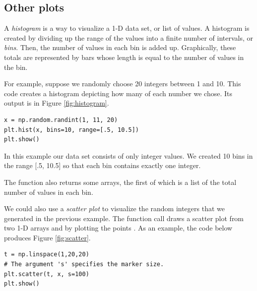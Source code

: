 \subsection*{Other plots}
A \emph{histogram} is a way to visualize a 1-D data set, or list of values.
A histogram is created by dividing up the range of the values into a finite number of intervals, or \emph{bins}.
Then, the number of values in each bin is added up.
Graphically, these totals are represented by bars whose length is equal to the number of values in the bin.

For example, suppose we randomly choose 20 integers between 1 and 10.
This code creates a histogram depicting how many of each number we chose.
Its output is in Figure \ref{fig:histogram}.

\begin{lstlisting}
x = np.random.randint(1, 11, 20)
plt.hist(x, bins=10, range=[.5, 10.5])
plt.show()
\end{lstlisting}

In this example our data set  consists of only integer values.
We created 10 bins in the range [.5, 10.5] so that each bin contains exactly one integer.

The function  also returns some arrays, the first of which is a list of the total number of values in each bin.

We could also use a \emph{scatter plot} to visualize the random integers  that we generated in the previous example.
The  function call  draws a scatter plot from two 1-D arrays  and  by plotting the points .
As an example, the code below produces Figure \ref{fig:scatter}.

\begin{lstlisting}
t = np.linspace(1,20,20)
# The argument 's' specifies the marker size.
plt.scatter(t, x, s=100)
plt.show()
\end{lstlisting}


